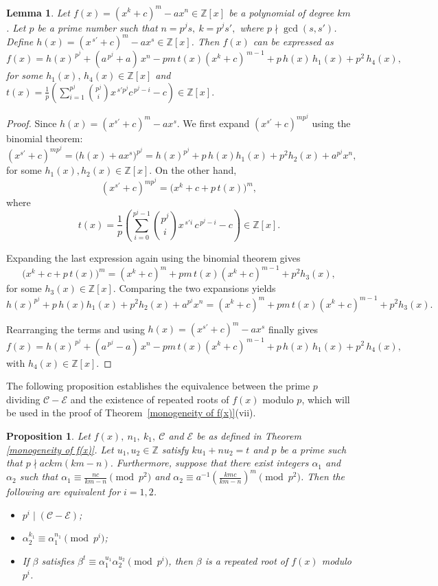 \documentclass[table]{amsart}
\newtheorem{lemma}[theorem]{Lemma}
\newtheorem{proposition}[theorem]{Proposition}
\newcommand{\Z}{\mathbb{Z}}
\newcommand{\calC}{\mathcal{C}}
\newcommand{\calE}{\mathcal{E}}
\numberwithin{equation}{section}
\begin{document}
\begin{lemma}\label{lemma:3.6}
	Let $f(x)=(x^k+c)^m-ax^n\in\Z[x]$ be a polynomial of degree $km$. Let $p$ be a prime number such that $n=p^js,~k=p^js',$ where $p\nmid\gcd(s,s')$. Define $h(x)=(x^{\,s'}+c)^m-ax^s\in\Z[x]$. Then $f(x)$ can be expressed as \[f(x) =  h(x)^{\,p^{j}}+(a^{\,p^{j}} + a)\,x^{n} - p m\, t(x)(x^{k} + c)^{\,m-1}+ p\,h(x)\,h_{1}(x) + p^{2}\,h_{4}(x),\] for some $h_1(x),\, h_4(x)\in\Z[x]$ and $t(x) = \frac{1}{p} \left( \sum_{i=1}^{p^{j}} \binom{p^{j}}{i} x^{\,s' p^{j}} c^{\,p^{j}-i} - c \right) \in \mathbb{Z}[x].$
\end{lemma}
\begin{proof}
Since  $h(x) = (x^{s'} + c)^m - a x^s.$ We first expand $(x^{s'} + c)^{mp^j}$ using the binomial theorem:
\[
(x^{s'} + c)^{mp^j}
= \bigl( h(x) + ax^s \bigr)^{p^{j}}
= h(x)^{p^{j}} + p\,h(x)h_{1}(x)  + p^{2}h_{2}(x)+ a^{p^{j}}x^{n},
\]
for some $h_{1}(x), h_{2}(x) \in \mathbb{Z}[x]$. On the other hand,
\[
(x^{s'} + c)^{mp^j}
= \bigl( x^{k} + c + p\,t(x) \bigr)^{m},
\]
where
\[
t(x) = \frac{1}{p} \left( \sum_{i=0}^{p^{j}-1} \binom{p^{j}}{i} x^{\,s' i}\, c^{\,p^{j}-i} - c \right) \in \mathbb{Z}[x].
\]

Expanding the last expression again using the binomial theorem gives
\[
\bigl( x^{k} + c + p\,t(x) \bigr)^{m}
= (x^{k} + c)^{m} + p m\, t(x) (x^{k} + c)^{m-1} + p^{2} h_{3}(x),
\]
for some $h_{3}(x) \in \mathbb{Z}[x]$. Comparing the two expansions yields
\[
h(x)^{p^{j}} + p\,h(x)h_{1}(x) + p^{2}h_{2}(x)+ a^{p^{j}}x^{n}
= (x^{k} + c)^{m} + p m\, t(x) (x^{k} + c)^{m-1} + p^{2} h_{3}(x).
\]

Rearranging the terms and using $h(x) = (x^{s'} + c)^m - a x^s$ finally gives
\[
f(x) =  h(x)^{\,p^{j}}+(a^{\,p^{j}} - a)\,x^{n} - p m\, t(x)(x^{k} + c)^{\,m-1}+ p\,h(x)\,h_{1}(x) + p^{2}\,h_{4}(x),
\]
with $h_{4}(x) \in \mathbb{Z}[x]$.
\end{proof}
The following proposition establishes the equivalence between the prime $p$ dividing $\calC-\calE$ and the existence of repeated roots of $f(x)$ modulo $p$, which will be used in the proof of Theorem~\ref{monogeneity of f(x)}(vii).
\begin{proposition}\label{2.06}
	Let $f(x), ~n_1, ~k_1, ~\calC$ and $\calE$ be as defined in Theorem \ref{monogeneity of f(x)}. Let $u_1, u_2\in \Z$ satisfy $ ku_1+nu_2=t$ and $p$ be a prime such that $p\nmid ackm(km-n)$. Furthermore, suppose that there exist integers $ \alpha_1$ and $\alpha_2$ such that $\alpha_1 \equiv \frac{nc}{km-n} \pmod{p^2}$ and $\alpha_2\equiv a^{-1} \left(\frac{kmc}{km-n}\right)^m \pmod{p^2}$. Then the following are equivalent for $i=1,2$.
	\begin{itemize}
		\item[\textup{(i)}] $p^i\mid (\calC-\calE)$;
		\item [\textup{(ii)}] $\alpha_2^{k_1}\equiv\alpha_1^{n_1}\pmod{p^i}$;
		\item [\textup{(iii)}] If $\beta$ satisfies $\beta^t \equiv \alpha_1^{u_1} \alpha_2^{u_2} \pmod{p^i}$, then $\beta$ is a repeated root of $f(x)$ modulo $p^i$.
	\end{itemize}
\end{proposition}
\end{document}
